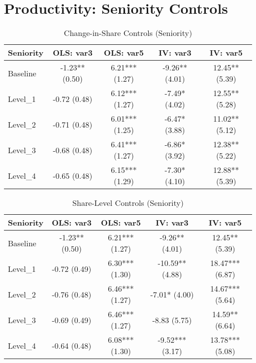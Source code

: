 \documentclass[11pt]{article}
\begin{document}
\section{Productivity: Seniority Controls}

\begin{table}[H]
\centering
\caption{Change-in-Share Controls (Seniority)}
\begin{tabular}{lcccc}
\toprule
Seniority & OLS: var3 & OLS: var5 & IV: var3 & IV: var5 \\
\midrule
Baseline & -1.23** (0.50) & 6.21*** (1.27) & -9.26** (4.01) & 12.45** (5.39) \\
Level\_1 & -0.72 (0.48) & 6.12*** (1.27) & -7.49* (4.02) & 12.55** (5.28) \\
Level\_2 & -0.71 (0.48) & 6.01*** (1.25) & -6.47* (3.88) & 11.02** (5.12) \\
Level\_3 & -0.68 (0.48) & 6.41*** (1.27) & -6.86* (3.92) & 12.38** (5.22) \\
Level\_4 & -0.65 (0.48) & 6.15*** (1.29) & -7.30* (4.10) & 12.88** (5.39) \\
\bottomrule
\end{tabular}
\end{table}

\begin{table}[H]
\centering
\caption{Share-Level Controls (Seniority)}
\begin{tabular}{lcccc}
\toprule
Seniority & OLS: var3 & OLS: var5 & IV: var3 & IV: var5 \\
\midrule
Baseline & -1.23** (0.50) & 6.21*** (1.27) & -9.26** (4.01) & 12.45** (5.39) \\
Level\_1 & -0.72 (0.49) & 6.30*** (1.30) & -10.59** (4.88) & 18.47*** (6.87) \\
Level\_2 & -0.76 (0.48) & 6.46*** (1.27) & -7.01* (4.00) & 14.67*** (5.64) \\
Level\_3 & -0.69 (0.49) & 6.46*** (1.27) & -8.83 (5.75) & 14.59** (6.64) \\
Level\_4 & -0.64 (0.48) & 6.08*** (1.30) & -9.52*** (3.17) & 13.78*** (5.08) \\
\bottomrule
\end{tabular}
\end{table}
\end{document}
